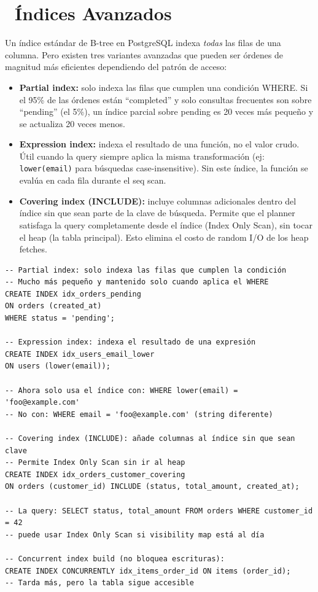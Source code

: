 \section[Índices Avanzados]{~Índices Avanzados}

Un índice estándar de B-tree en PostgreSQL indexa \emph{todas} las filas de una columna.
Pero existen tres variantes avanzadas que pueden ser órdenes de magnitud más eficientes dependiendo del patrón de acceso:

\begin{itemize}
  \item \textbf{Partial index:} solo indexa las filas que cumplen una condición WHERE. Si el 95\% de las órdenes están ``completed'' y solo consultas frecuentes son sobre ``pending'' (el 5\%), un índice parcial sobre pending es 20 veces más pequeño y se actualiza 20 veces menos.
  \item \textbf{Expression index:} indexa el resultado de una función, no el valor crudo. Útil cuando la query siempre aplica la misma transformación (ej: \texttt{lower(email)} para búsquedas case-insensitive). Sin este índice, la función se evalúa en cada fila durante el seq scan.
  \item \textbf{Covering index (INCLUDE):} incluye columnas adicionales dentro del índice sin que sean parte de la clave de búsqueda. Permite que el planner satisfaga la query completamente desde el índice (Index Only Scan), sin tocar el heap (la tabla principal). Esto elimina el costo de random I/O de los heap fetches.
\end{itemize}

\begin{lstlisting}[caption={Partial, expression y covering indexes}]
-- Partial index: solo indexa las filas que cumplen la condición
-- Mucho más pequeño y mantenido solo cuando aplica el WHERE
CREATE INDEX idx_orders_pending
ON orders (created_at)
WHERE status = 'pending';

-- Expression index: indexa el resultado de una expresión
CREATE INDEX idx_users_email_lower
ON users (lower(email));

-- Ahora solo usa el índice con: WHERE lower(email) = 'foo@example.com'
-- No con: WHERE email = 'foo@example.com' (string diferente)

-- Covering index (INCLUDE): añade columnas al índice sin que sean clave
-- Permite Index Only Scan sin ir al heap
CREATE INDEX idx_orders_customer_covering
ON orders (customer_id) INCLUDE (status, total_amount, created_at);

-- La query: SELECT status, total_amount FROM orders WHERE customer_id = 42
-- puede usar Index Only Scan si visibility map está al día

-- Concurrent index build (no bloquea escrituras):
CREATE INDEX CONCURRENTLY idx_items_order_id ON items (order_id);
-- Tarda más, pero la tabla sigue accesible
\end{lstlisting}


